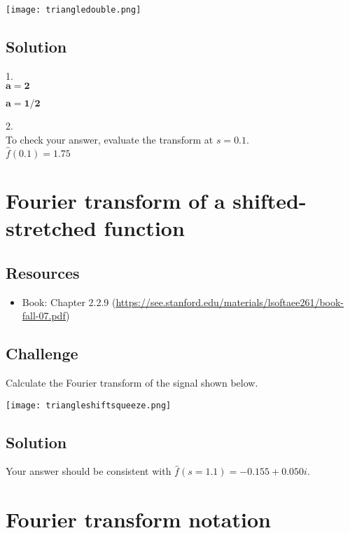 \texttt{[image: triangledouble.png]}

\subsection*{Solution}
1.\\
$\bm{a=2}$\\

$\bm{a=1/2}$\\

2.\\
To check your answer, evaluate the transform at $s=0.1$.\\
$\hat{f}(0.1)=1.75$




\newpage
\section{Fourier transform of a shifted-stretched function}
\label{sec:shiftstretch}

\subsection*{Resources}
\begin{itemize}
    \item Book: Chapter 2.2.9 (\url{https://see.stanford.edu/materials/lsoftaee261/book-fall-07.pdf})
\end{itemize}

\subsection*{Challenge}
Calculate the Fourier transform of the signal shown below.

\texttt{[image: triangleshiftsqueeze.png]}

\subsection*{Solution}
Your answer should be consistent with $\hat{f}(s=1.1) = -0.155 + 0.050 i$.




\newpage
\section{Fourier transform notation}

